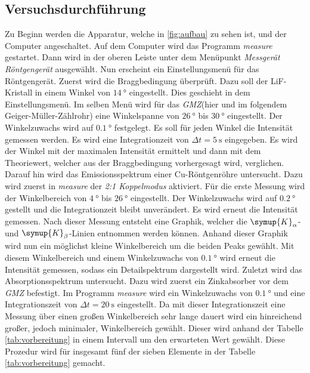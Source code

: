 \subsection{Versuchsdurchführung}
\label{subsec:versuchsdurchführung}
Zu Beginn werden die Apparatur, welche in \autoref{fig:aufbau} zu sehen ist, und der Computer angeschaltet. Auf dem Computer wird das Programm \textit{measure} gestartet.
Dann wird in der oberen Leiste unter dem Menüpunkt \textit{Messgerät} \textit{Röntgengerät} ausgewählt. Nun erscheint ein Einstellungsmenü für das Röntgengerät.
Zuerst wird die Braggbedingung überprüft. Dazu soll der LiF-Kristall in einem Winkel von $\qty{14}{\degree}$ eingestellt. Dies geschieht in dem Einstellungsmenü. Im selben 
Menü wird für das \textit{GMZ}(hier und im folgendem Geiger-Müller-Zählrohr) eine Winkelspanne von $\qty{26}{\degree}$ bis $\qty{30}{\degree}$ eingestellt. Der Winkelzuwachs
wird auf $\qty{0.1}{\degree}$ festgelegt. Es soll für jeden Winkel die Intensität gemessen werden. Es wird eine Integrationzeit von $\Delta t = \qty{5}{\second}$ eingegeben.
Es wird der Winkel mit der maximalen Intensität ermittelt und dann mit dem Theoriewert, welcher aus der Braggbedingung vorhergesagt wird, verglichen.
Darauf hin wird das Emissionsspektrum einer Cu-Röntgenröhre untersucht. Dazu wird zuerst in \textit{measure} der \textit{2:1 Koppelmodus} aktiviert. Für die erste Messung 
wird der Winkelbereich von $\qty{4}{\degree}$ bis $\qty{26}{\degree}$ eingestellt. Der Winkelzuwachs wird auf $\qty{0.2}{\degree}$ gestellt und die Integrationzeit bleibt 
unverändert. Es wird erneut die Intensität gemessen. Nach dieser Messung entsteht eine Graphik, welcher die $\symup{K}_\alpha$- und $\symup{K}_\beta$-Linien entnommen werden
können. Anhand dieser Graphik wird nun ein möglichst kleine Winkelbereich um die beiden Peaks gewählt. Mit diesem Winkelbereich und einem Winkelzuwachs von
$\qty{0.1}{\degree}$ wird erneut die Intensität gemessen, sodass ein Detailspektrum dargestellt wird. 
Zuletzt wird das Absorptionsspektrum untersucht. Dazu wird zuerst ein Zinkabsorber vor dem \textit{GMZ} befestigt. Im Programm \textit{measure} wird ein Winkelzuwachs
von $\qty{0.1}{\degree}$ und eine Integrationszeit von $\Delta t = \qty{20}{\second}$ eingestellt. Da mit dieser Integrationszeit eine Messung über einen großen 
Winkelbereich sehr lange dauert wird ein hinreichend großer, jedoch minimaler, Winkelbereich gewählt. Dieser wird anhand der Tabelle \ref{tab:vorbereitung} in einem Intervall
um den erwarteten Wert gewählt. Diese Prozedur wird für insgesamt fünf der sieben Elemente in der Tabelle \ref{tab:vorbereitung} gemacht. 
